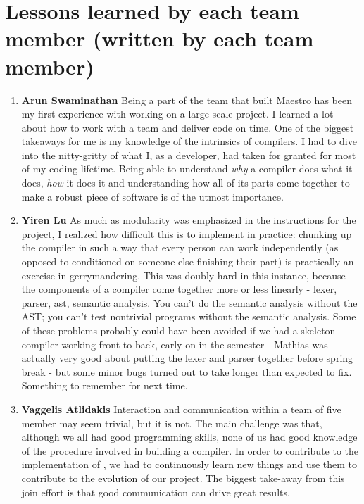 \section{Lessons learned by each team member (written by each team member)}
\begin{enumerate}
\item \textbf{Arun Swaminathan} \newline
Being a part of the team that built Maestro has been my first experience with working on a large-scale project. I learned a lot about how to work with a team and deliver code on time.
One of the biggest takeaways for me is my knowledge of the intrinsics of compilers. I had to dive into the nitty-gritty of what I, as a developer, had taken for granted for most of my coding lifetime. Being able to understand \textit{why} a compiler does what it does, \textit{how} it does it and understanding how all of its parts come together to make a robust piece of software is of the utmost importance.

\item \textbf{Yiren Lu} \newline
As much as modularity was emphasized in the instructions for the project, I
realized how difficult this is to implement in practice: chunking up the
compiler in such a way that every person can work independently (as opposed to
conditioned on someone else finishing their part) is practically an exercise in
gerrymandering. This was doubly hard in this instance, because the components
of a compiler come together more or less linearly - lexer, parser, ast,
semantic analysis. You can't do the semantic analysis without the AST; you
can't test nontrivial programs without the semantic analysis. Some of these
problems probably could have been avoided if we had a skeleton compiler working
front to back, early on in the semester - Mathias was actually very good about
putting the lexer and parser together before spring break - but some minor bugs
turned out to take longer than expected to fix. Something to remember for next
time.

\item \textbf{Vaggelis Atlidakis} \newline
Interaction and communication within a team of five member may seem trivial,
but it is not. The main challenge was that, although we all had
good programming skills, none of us had good knowledge of the procedure
involved in building a compiler. In order to contribute to the implementation
of \lang{}, we had to continuously learn new things and use them to contribute
to the evolution of our project. The biggest take-away from this join effort is
that good communication can drive great results.



\end{enumerate}
